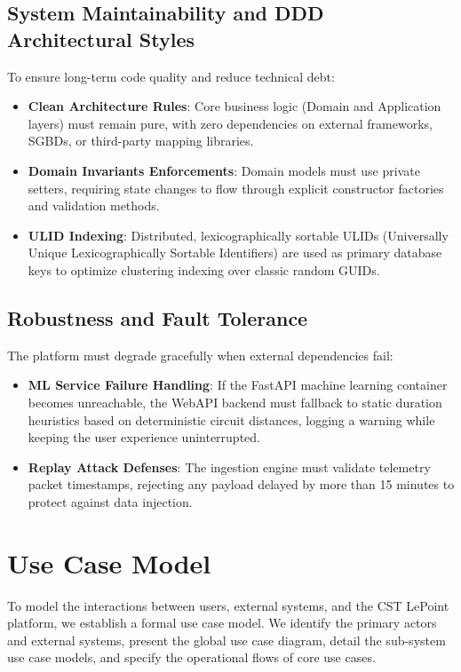 \subsection{System Maintainability and DDD Architectural Styles}
To ensure long-term code quality and reduce technical debt:
\begin{itemize}
  \item \textbf{Clean Architecture Rules}: Core business logic (Domain and Application layers) must remain pure, with zero dependencies on external frameworks, SGBDs, or third-party mapping libraries.
  \item \textbf{Domain Invariants Enforcements}: Domain models must use private setters, requiring state changes to flow through explicit constructor factories and validation methods.
  \item \textbf{ULID Indexing}: Distributed, lexicographically sortable ULIDs (Universally Unique Lexicographically Sortable Identifiers) are used as primary database keys to optimize clustering indexing over classic random GUIDs.
\end{itemize}

\subsection{Robustness and Fault Tolerance}
The platform must degrade gracefully when external dependencies fail:
\begin{itemize}
  \item \textbf{ML Service Failure Handling}: If the FastAPI machine learning container becomes unreachable, the WebAPI backend must fallback to static duration heuristics based on deterministic circuit distances, logging a warning while keeping the user experience uninterrupted.
  \item \textbf{Replay Attack Defenses}: The ingestion engine must validate telemetry packet timestamps, rejecting any payload delayed by more than 15 minutes to protect against data injection.
\end{itemize}

\section{Use Case Model}

To model the interactions between users, external systems, and the CST LePoint platform, we establish a formal use case model. We identify the primary actors and external systems, present the global use case diagram, detail the sub-system use case models, and specify the operational flows of core use cases.

